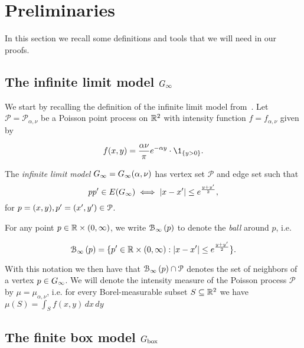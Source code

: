 
\section{Preliminaries\label{sec:proof_outline}}

In this section we recall some definitions and tools that we will need in our proofs.

\subsection{The infinite limit model $G_{\infty}$\label{ssec:infinite_model}}

We start by recalling the definition of the infinite limit model from~\cite{fountoulakis2018law}.
Let $\mathcal{P}=\mathcal{P}_{\alpha,\nu}$ 
be a Poisson point process on ${\mathbb R}^2$ with intensity function $f=f_{\alpha,\nu}$ given by

\begin{equation}\label{eq:def_intensity_function_f}
	f(x,y) = \frac{\alpha \nu}{\pi} e^{-\alpha y} \cdot \1_{\{y>0\}}.
\end{equation} 

The \emph{infinite limit model} $G_{\infty} = G_{\infty}(\alpha,\nu)$ has vertex set $\mathcal{P}$ and edge set such that
\[
	pp' \in E(G_{\infty}) \iff |x - x'| \leq e^{\frac{y + y'}{2}},
\]
for $p=(x,y),p'=(x',y')\in{\mathcal P}$.

For any point $p \in {\ensuremath{\mathbb R}} \times (0,\infty)$, we write ${\mathcal B}_{\infty}\left(p\right)$ to denote the \emph{ball} around $p$, i.e.

\begin{equation}\label{eq:def_ball_P}
	{\mathcal B}_{\infty}\left(p\right) = \{p^\prime \in {\mathbb R}\times(0,\infty) : |x - x^\prime| \leq e^{\frac{y + y^\prime}{2}}\}.
\end{equation}

With this notation we then have that ${\mathcal B}_{\infty}\left(p\right) \cap {\mathcal P}$ denotes the set of neighbors of a vertex $p \in G_{\infty}$.
We will denote the intensity measure of the Poisson process $\mathcal{P}$ by $\mu = \mu_{\alpha, \nu}$, i.e. for every 
Borel-measurable subset $S \subseteq {\mathbb R}^2$ we have $\mu(S) = \int_S f(x,y) \, dx \, dy$


\subsection{The finite box model $G_{\text{box}}$\label{ssec:finite_model}}


